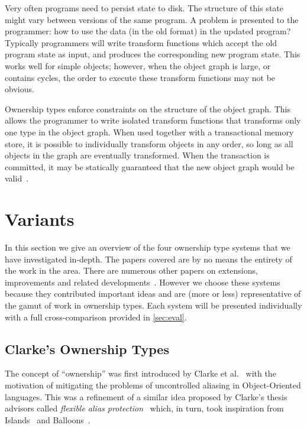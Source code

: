 \documentclass{acm_proc_article-sp}
\begin{document}
Very often programs need to persist state to disk. The structure of this state
might vary between versions of the same program. A problem is presented to the
programmer: how to use the data (in the old format) in the updated program?
Typically programmers will write transform functions which accept the old
program state as input, and produces the corresponding new program state. This
works well for simple objects; however, when the object graph is large, or
contains cycles, the order to execute these transform functions may not be
obvious.

Ownership types enforce constraints on the structure of the object graph. This
allows the programmer to write isolated transform functions that transforms only
one type in the object graph. When used together with a transactional memory
store, it is possible to individually transform objects in any order, so long as
all objects in the graph are eventually transformed. When the transaction is
committed, it may be statically guaranteed that the new object graph would be
valid~\cite{boyapati04safejava,boyapati03innerclass}.

\section{Variants}
\label{sec:variants}

In this section we give an overview of the four ownership type systems that we
have investigated in-depth. The papers covered are by no means the entirety of
the work in the area. There are numerous other papers on extensions,
improvements and related developments~\cite{clarke13survey}. However we choose
these systems because they contributed important ideas and are (more or less)
representative of the gamut of work in ownership types. Each system will be
presented individually with a full cross-comparison provided in \cref{sec:eval}.

\subsection{Clarke's Ownership Types}
\label{subsec:clarke}

The concept of ``ownership'' was first introduced by Clarke et
al.~\cite{clarke98ownership,clarke01ownership} with the motivation of
mitigating the problems of uncontrolled aliasing in Object-Oriented languages.
This was a refinement of a similar idea proposed by Clarke's thesis advisors
called \emph{flexible alias protection}~\cite{noble98alias} which, in turn,
took inspiration from Islands~\cite{hogg91islands} and
Balloons~\cite{almeida97balloons}.
\end{document}
